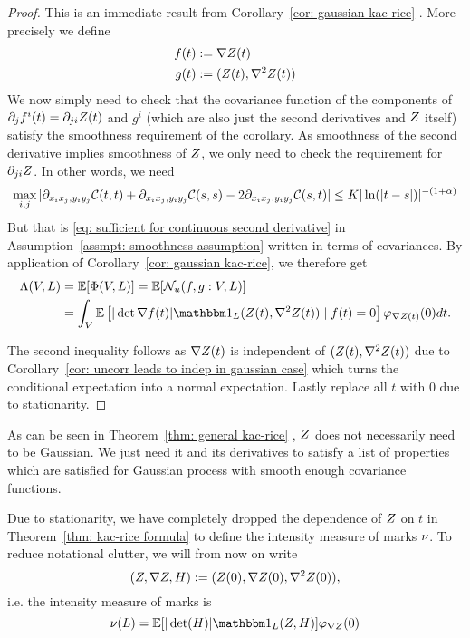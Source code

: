 \begin{proof}
	This is an immediate result from Corollary~\ref{cor: gaussian kac-rice}
	\parencite[Corollary~11.2.2]{adlerRandomFieldsGeometry2007}. More precisely
	we define
	\begin{align*}
		f(t) &:= \nabla Z(t)\\
		g(t) &:= (Z(t), \nabla^2 Z(t))
	\end{align*}
	We now simply need to check that the covariance function of the components of
	\(\partial_j f^i(t) = \partial_{ji} Z(t)\) and \(g^i\) (which are
	also just the second derivatives and \(Z\) itself) satisfy the smoothness
	requirement of the corollary. As smoothness of the second derivative implies
	smoothness of \(Z\), we only need to check the requirement for \(\partial_{ji} Z\).
	In other words, we need
	\[
		\max_{i,j}|\partial_{x_i x_j, y_i y_j}\mathcal{C}(t,t)
		+ \partial_{x_i x_j, y_i y_j}\mathcal{C}(s,s)
		-2\partial_{x_i x_j, y_i y_j}\mathcal{C}(s,t)| \le K |\ln(|t-s|)|^{-(1+\alpha)}
	\]
	But that is \eqref{eq: sufficient for continuous second derivative} in
	Assumption~\ref{assmpt: smoothness assumption} written in terms of
	covariances. By application
	of Corollary~\ref{cor: gaussian kac-rice}, we therefore get
	\begin{align*}
		\intensityMeas(\Vol, L) 
		&= \E[\pp(\Vol, L)]
		= \E[\level(f, g: \Vol, L)]\\
		&= \int_\Vol \E\left[
			|\det \nabla f(t)| \ind_L(\rf(t), \nabla^2\rf(t)) \mid f(t) = 0
		\right] \density_{\nabla\rf(t)}(0)dt.
	\end{align*}
	
	
	The second inequality follows as \(\nabla Z(t)\) is independent of
	\((Z(t),\nabla^2Z(t))\) due to Corollary~\ref{cor: uncorr leads to indep
	in gaussian case} which turns the conditional expectation into a normal
	expectation. Lastly replace all \(t\) with \(0\) due to stationarity.
\end{proof}
\begin{remark}
	As can be seen in Theorem~\ref{thm: general kac-rice} \parencite[Theorem
	11.2.1]{adlerRandomFieldsGeometry2007}, \(Z\) does not necessarily
	need to be Gaussian. We just need it and its derivatives to satisfy a
	list of properties which are satisfied for Gaussian process with
	smooth enough covariance functions.
\end{remark}

Due to stationarity, we have completely dropped the dependence of \(Z\) on
\(t\) in Theorem~\ref{thm: kac-rice formula} to define the intensity measure
of marks \(\nu\). To reduce notational clutter, we will from now on write
\[
	(Z,\nabla Z, H):= (Z(0),\nabla Z(0), \nabla^2Z(0)),
\]
i.e. the intensity measure of marks is
\begin{equation}\label{eq: intensity meas of marks}
	\markIntMeas(L) = \E[|\det(H)| \ind_L(\rf,H)] \varphi_{\nabla \rf}(0)
\end{equation}

